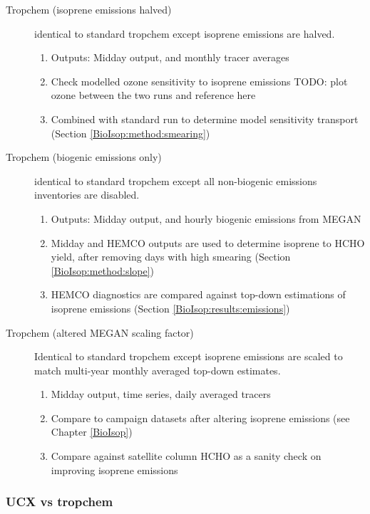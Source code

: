 \begin{description}
        \item [Tropchem (isoprene emissions halved)]%
          identical to standard tropchem except isoprene emissions are halved.
          \begin{enumerate}
            \item Outputs: Midday output, and monthly tracer averages 
            \item Check modelled ozone sensitivity to isoprene emissions TODO: plot ozone between the two runs and reference here
            \item Combined with standard run to determine model sensitivity transport (Section \ref{BioIsop:method:smearing})
          \end{enumerate}
        
        \item [Tropchem (biogenic emissions only)]%
          identical to standard tropchem except all non-biogenic emissions inventories are disabled.
          \begin{enumerate}
            \item Outputs: Midday output, and hourly biogenic emissions from MEGAN
            \item Midday and HEMCO outputs are used to determine isoprene to HCHO yield, after removing days with high smearing (Section \ref{BioIsop:method:slope})
            \item HEMCO diagnostics are compared against top-down estimations of isoprene emissions (Section \ref{BioIsop:results:emissions})
          \end{enumerate}
        
        \item [Tropchem (altered MEGAN scaling factor)]%
          Identical to standard tropchem except isoprene emissions are scaled to match multi-year monthly averaged top-down estimates.
          \begin{enumerate}
            \item Midday output, time series, daily averaged tracers
            \item Compare to campaign datasets after altering isoprene emissions (see Chapter \ref{BioIsop})
            \item Compare against satellite column HCHO as a sanity check on improving isoprene emissions
          \end{enumerate}
      \end{description}
    
    \subsubsection{UCX vs tropchem}
      \label{Model:GC:simulations:comparison}
      
